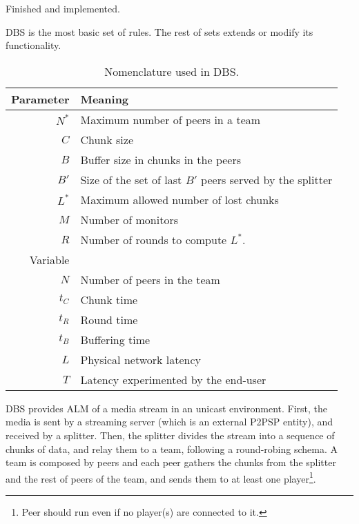 
\label{sec:DBS}

\begin{notex}
  Finished and implemented.
\end{notex}

\acrshort{DBS} is the most basic set of rules. The rest of sets extends or modify
its functionality.

\begin{table}
  \centering
  \begin{tabular}{rl}
    Parameter & Meaning \\
    \hline
    $N^*$  & Maximum number of peers in a team \\
    $C$    & Chunk size \\
    $B$    & Buffer size in chunks in the peers \\
    $B'$   & Size of the set of last $B'$ peers served by the splitter \\ 
    $L^*$  & Maximum allowed number of lost chunks \\
    $M$    & Number of monitors \\
    $R$    & Number of rounds to compute $L^*$. \\
    Variable & \\
    \hline
    $N$    & Number of peers in the team \\
    $t_C$  & Chunk time \\
    $t_R$  & Round time \\
    $t_B$  & Buffering time \\
    $L$    & Physical network latency \\
    $T$    & Latency experimented by the end-user
  \end{tabular}
  \caption{Nomenclature used in DBS.} %
  \label{tab:DBS_nomenclature}
\end{table}

DBS provides \acrshort{ALM} of a \gls{media} \gls{stream} in an
\gls{unicast} environment. First, the media is sent by a streaming
\gls{server} (which is an external P2PSP entity), and received by a
\gls{splitter}. Then, the splitter
divides the stream into a sequence of \gls{chunk}s of data, and relay
them to a \gls{team}, following a round-robing schema. A team
is composed by \gls{peer}s and each peer gathers the chunks from the
splitter and the rest of peers of the team, and sends them to at least
one \gls{player}\footnote{Peer should run even if no player(s) are
  connected to it.}.

